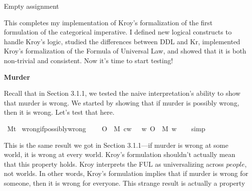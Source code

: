\begin{isabellebody}
{  Empty assignment\color{black}%
}%
\endisatagproof
{\isafoldproof}%
%
\isadelimproof
%
\endisadelimproof
%
\begin{isamarkuptext}%
This completes my implementation of Kroy's formalization of the first formulation of the 
categorical imperative. I defined new logical constructs to handle Kroy's logic, studied the differences
between DDL and Kr, implemented Kroy's formalization of the Formula of Universal Law, and showed 
that it is both non-trivial and consistent. Now it's time to start testing!%
\end{isamarkuptext}\isamarkuptrue%
%
\isadelimdocument
%
\endisadelimdocument
%
\isatagdocument
%
\isamarkuptrue%
%
\endisatagdocument
{\isafolddocument}%
%
\isadelimdocument
%
\endisadelimdocument
%
\textbf{Murder}
%
\begin{isamarkuptext}%
Recall that in Section 3.1.1, we tested the naive interpretation's ability to show that murder 
is wrong. We started by showing that if murder is possibly wrong, then it is wrong. Let's test that 
here.%
\end{isamarkuptext}\isamarkuptrue%
\isamarkupfalse%
\ M{\isacharcolon}{\isacharcolon}{\isachardoublequoteopen}t{\isachardoublequoteclose}\isanewline
%
\isanewline
\isanewline
{}\isamarkupfalse%
\ wrong{\isacharunderscore}if{\isacharunderscore}possibly{\isacharunderscore}wrong{\isacharcolon}\isanewline
\ \ \ {\isachardoublequoteopen}{\isacharparenleft}{\isacharparenleft}{\isasymdiamond}\ {\isacharparenleft}O\ {\isacharbraceleft}\isactrlbold {\isasymnot}\ M{\isacharbraceright}{\isacharparenright}{\isacharparenright}\ cw{\isacharparenright}\ {\isasymlongrightarrow}\ \ {\isacharparenleft}{\isasymforall}w{\isachardot}\ {\isacharparenleft}O\ {\isacharbraceleft}\isactrlbold {\isasymnot}\ M{\isacharbraceright}{\isacharparenright}\ w{\isacharparenright}{\isachardoublequoteclose}\isanewline
%
\isadelimproof
\ \ %
\endisadelimproof
%
\isatagproof
{}\isamarkupfalse%
\ simp%
\endisatagproof
{\isafoldproof}%
%
\isadelimproof
%
\endisadelimproof
%
\begin{isamarkuptext}%
This is the same result we got in Section 3.1.1—if murder is wrong at some world, it is wrong at
every world. Kroy's formulation shouldn't actually mean that this property holds. Kroy interprets the 
FUL as universalizing across $people$, not worlds. In other words, Kroy's formulation implies that if
murder is wrong for someone, then it is wrong for everyone. This strange result is actually a property 

\end{isamarkuptext}
\end{isabellebody}
